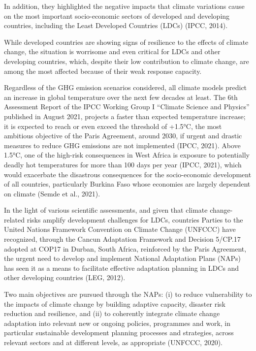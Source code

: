 \documentclass[
]{book}
\begin{document}
In addition, they highlighted the negative impacts that climate variations cause on the most important socio-economic sectors of developed and developing countries, including the Least Developed Countries (LDCs) (IPCC, 2014).

While developed countries are showing signs of resilience to the effects of climate change, the situation is worrisome and even critical for LDCs and other developing countries, which, despite their low contribution to climate change, are among the most affected because of their weak response capacity.

Regardless of the GHG emission scenarios considered, all climate models predict an increase in global temperature over the next few decades at least. The 6th Assessment Report of the IPCC Working Group I ``Climate Science and Physics'' published in August 2021, projects a faster than expected temperature increase; it is expected to reach or even exceed the threshold of +1.5°C, the most ambitious objective of the Paris Agreement, around 2030, if urgent and drastic measures to reduce GHG emissions are not implemented (IPCC, 2021). Above 1.5°C, one of the high-risk consequences in West Africa is exposure to potentially deadly hot temperatures for more than 100 days per year (IPCC, 2021), which would exacerbate the disastrous consequences for the socio-economic development of all countries, particularly Burkina Faso whose economies are largely dependent on climate (Semde et al., 2021).

In the light of various scientific assessments, and given that climate change-related risks amplify development challenges for LDCs, countries Parties to the United Nations Framework Convention on Climate Change (UNFCCC) have recognized, through the Cancun Adaptation Framework and Decision 5/CP.17 adopted at COP17 in Durban, South Africa, reinforced by the Paris Agreement, the urgent need to develop and implement National Adaptation Plans (NAPs) has seen it as a means to facilitate effective adaptation planning in LDCs and other developing countries (LEG, 2012).

Two main objectives are pursued through the NAPs: (i) to reduce vulnerability to the impacts of climate change by building adaptive capacity, disaster risk reduction and resilience, and (ii) to coherently integrate climate change adaptation into relevant new or ongoing policies, programmes and work, in particular sustainable development planning processes and strategies, across relevant sectors and at different levels, as appropriate (UNFCCC, 2020).
\end{document}
